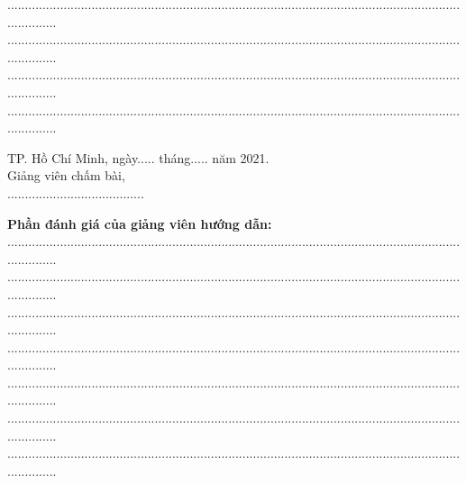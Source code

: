 \documentclass[12pt,a4paper,2sides]{report}
\newcommand{\nam}{2021}
\begin{document}
	...............................................................................................................................................\\
	...............................................................................................................................................\\
	...............................................................................................................................................\\
	...............................................................................................................................................
\begin{center}
	\hspace*{5cm} TP. Hồ Chí Minh, ngày..... tháng..... năm \nam.\\
	\hspace*{5cm} Giảng viên chấm bài,\\
	\vspace*{1.2cm}
	\hspace*{5cm} .......................................
\end{center}
	\vspace*{0.5cm}
	\textbf{Phần đánh giá của giảng viên hướng dẫn:}\\
	...............................................................................................................................................\\
	...............................................................................................................................................\\
	...............................................................................................................................................\\
	...............................................................................................................................................\\
	...............................................................................................................................................\\
	...............................................................................................................................................\\
	...............................................................................................................................................\\
\end{document}
